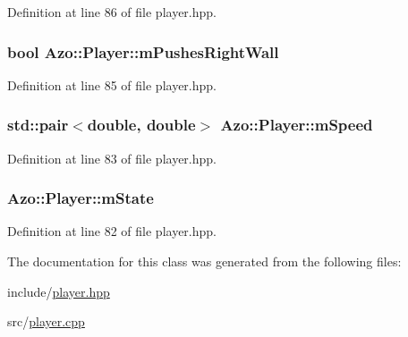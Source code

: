 Definition at line 86 of file player.\+hpp.

\subsubsection[{\texorpdfstring{m\+Pushes\+Right\+Wall}{mPushesRightWall}}]{\setlength{\rightskip}{0pt plus 5cm}bool Azo\+::\+Player\+::m\+Pushes\+Right\+Wall}\hypertarget{class_azo_1_1_player_a777f7f3207c772734e886188c85523fe}{}\label{class_azo_1_1_player_a777f7f3207c772734e886188c85523fe}


Definition at line 85 of file player.\+hpp.

\subsubsection[{\texorpdfstring{m\+Speed}{mSpeed}}]{\setlength{\rightskip}{0pt plus 5cm}std\+::pair$<$double, double$>$ Azo\+::\+Player\+::m\+Speed}\hypertarget{class_azo_1_1_player_a545f3a8fe6ace68bc67f9573ba179b3b}{}\label{class_azo_1_1_player_a545f3a8fe6ace68bc67f9573ba179b3b}


Definition at line 83 of file player.\+hpp.

\subsubsection[{\texorpdfstring{m\+State}{mState}}]{ Azo\+::\+Player\+::m\+State}\hypertarget{class_azo_1_1_player_a6c500f32806b1450aaf2acb66ae5b9bf}{}\label{class_azo_1_1_player_a6c500f32806b1450aaf2acb66ae5b9bf}


Definition at line 82 of file player.\+hpp.



The documentation for this class was generated from the following files\+:\begin{DoxyCompactItemize}
\item 
include/\hyperlink{player_8hpp}{player.\+hpp}\item 
src/\hyperlink{player_8cpp}{player.\+cpp}\end{DoxyCompactItemize}
